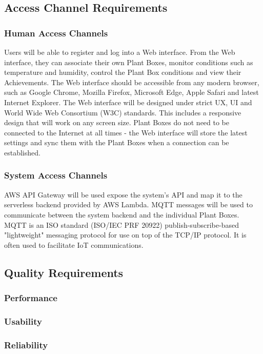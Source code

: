 \documentclass{article}
\begin{document}
\subsection{Access Channel Requirements}

\subsubsection{Human Access Channels}
Users will be able to register and log into a Web interface. From the Web interface, they can associate their own Plant Boxes, monitor conditions such as temperature and humidity, control the Plant Box conditions and view their Achievements. The Web interface should be accessible from any modern browser, such as Google Chrome, Mozilla Firefox, Microsoft Edge, Apple Safari and latest Internet Explorer. The Web interface will be designed under strict UX, UI and World Wide Web Consortium (W3C) standards. This includes a responsive design that will work on any screen size. Plant Boxes do not need to be connected to the Internet at all times - the Web interface will store the latest settings and sync them with the Plant Boxes when a connection can be established.     

\subsubsection{System Access Channels}
AWS API Gateway will be used expose the system's API and map it to the serverless backend provided by AWS Lambda. MQTT messages will be used to communicate between the system backend and the individual Plant Boxes. MQTT is an ISO standard (ISO/IEC PRF 20922) publish-subscribe-based "lightweight" messaging protocol for use on top of the TCP/IP protocol. It is often used to facilitate IoT communications.

\subsection{Quality Requirements}

\subsubsection{Performance}

\subsubsection{Usability}

\subsubsection{Reliability}
\end{document}
